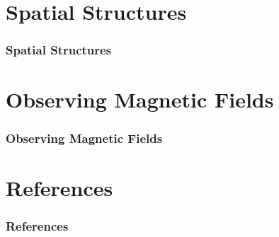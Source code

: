 \documentclass[mathserif]{beamer}
\begin{document}
\section{Spatial Structures}
\begin{frame}
    \frametitle{Spatial Structures}

\end{frame}


\section{Observing Magnetic Fields}
\begin{frame}
    \frametitle{Observing Magnetic Fields}

\end{frame}


\section{References}
\begin{frame}
    \frametitle<presentation>{References}

\end{frame}
\end{document}
